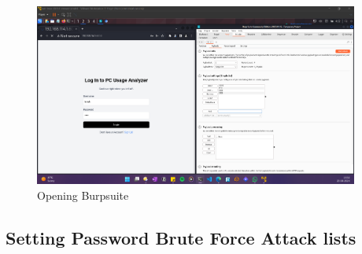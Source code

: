 \documentclass[11pt]{article}
\begin{document}

\begin{figure}[H]
    \centering
    \includegraphics[width=0.95\textwidth]{burpsuite (6).png}
    \caption{Opening Burpsuite}
    \label{fig:1}
\end{figure}
\subsection{Setting Password Brute Force Attack lists}



\end{document}
